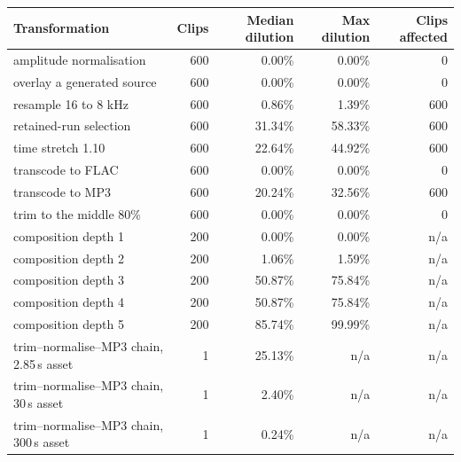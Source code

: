 \begin{tabular}{lrrrr}
\toprule
Transformation & Clips & Median dilution & Max dilution & Clips affected \\
\midrule
amplitude normalisation & 600 & 0.00\% & 0.00\% & 0 \\
overlay a generated source & 600 & 0.00\% & 0.00\% & 0 \\
resample 16 to 8 kHz & 600 & 0.86\% & 1.39\% & 600 \\
retained-run selection & 600 & 31.34\% & 58.33\% & 600 \\
time stretch 1.10 & 600 & 22.64\% & 44.92\% & 600 \\
transcode to FLAC & 600 & 0.00\% & 0.00\% & 0 \\
transcode to MP3 & 600 & 20.24\% & 32.56\% & 600 \\
trim to the middle 80\% & 600 & 0.00\% & 0.00\% & 0 \\
composition depth 1 & 200 & 0.00\% & 0.00\% & n/a \\
composition depth 2 & 200 & 1.06\% & 1.59\% & n/a \\
composition depth 3 & 200 & 50.87\% & 75.84\% & n/a \\
composition depth 4 & 200 & 50.87\% & 75.84\% & n/a \\
composition depth 5 & 200 & 85.74\% & 99.99\% & n/a \\
trim--normalise--MP3 chain, 2.85\,s asset & 1 & 25.13\% & n/a & n/a \\
trim--normalise--MP3 chain, 30\,s asset & 1 & 2.40\% & n/a & n/a \\
trim--normalise--MP3 chain, 300\,s asset & 1 & 0.24\% & n/a & n/a \\
\bottomrule
\end{tabular}
